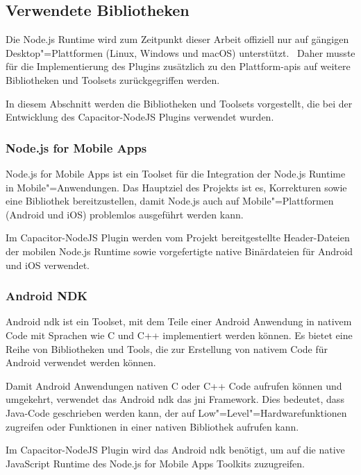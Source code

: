 \subsection{Verwendete Bibliotheken}

Die Node.js Runtime wird zum Zeitpunkt dieser Arbeit offiziell nur auf gängigen Desktop"=Plattformen (Linux, Windows und macOS) unterstützt.~\cite{nodejs}
Daher musste für die Implementierung des Plugins zusätzlich zu den Plattform-\acsp{api} auf weitere Bibliotheken und Toolsets zurückgegriffen werden.

In diesem Abschnitt werden die Bibliotheken und Toolsets vorgestellt, die bei der Entwicklung des Capacitor-NodeJS Plugins verwendet wurden.

\subsubsection{Node.js for Mobile Apps}

Node.js for Mobile Apps ist ein Toolset für die Integration der Node.js Runtime in Mobile"=Anwendungen.
Das Hauptziel des Projekts ist es, Korrekturen sowie eine Bibliothek bereitzustellen, damit Node.js auch auf Mobile"=Plattformen (Android und iOS) problemlos ausgeführt werden kann.
\cite{nodejs-mobile, nodejs-mobile:docs}

Im Capacitor-NodeJS Plugin werden vom Projekt bereitgestellte Header-Dateien der mobilen Node.js Runtime sowie vorgefertigte native Binärdateien für Android und iOS verwendet.

\subsubsection{Android NDK}

Android \ac{ndk} ist ein Toolset, mit dem Teile einer Android Anwendung in nativem Code mit Sprachen wie C und C++ implementiert werden können.
Es bietet eine Reihe von Bibliotheken und Tools, die zur Erstellung von nativem Code für Android verwendet werden können.
\cite{android:ndk}

Damit Android Anwendungen nativen C oder C++ Code aufrufen können und umgekehrt, verwendet das Android \ac{ndk} das \ac{jni} Framework.
Dies bedeutet, dass Java-Code geschrieben werden kann, der auf Low"=Level"=Hardwarefunktionen zugreifen oder Funktionen in einer nativen Bibliothek aufrufen kann.
\cite{android:ndk}

Im Capacitor-NodeJS Plugin wird das Android \ac{ndk} benötigt, um auf die native JavaScript Runtime des Node.js for Mobile Apps Toolkits zuzugreifen.
\cite{nodejs-mobile:docs}
